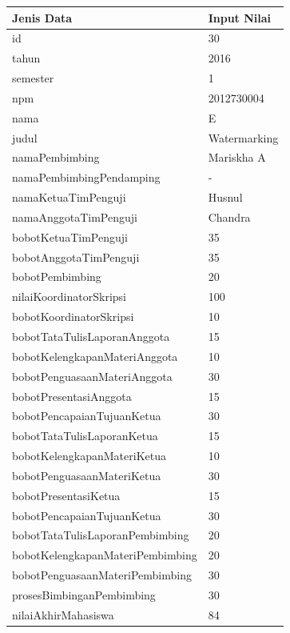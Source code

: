 	\begin{tabular}{| m{7cm} | m{5cm} |}
		\hline
		Jenis Data & Input Nilai\\
		\hline
		id & 30\\
		\hline
		tahun & 2016\\
		\hline
		semester & 1\\
		\hline
		npm & 2012730004\\
		\hline
		nama & E\\
		\hline
		judul & Watermarking\\
		\hline
		namaPembimbing & Mariskha A\\
		\hline
		namaPembimbingPendamping & -\\
		\hline
		namaKetuaTimPenguji & Husnul\\
		\hline
		namaAnggotaTimPenguji & Chandra\\
		\hline
		bobotKetuaTimPenguji & 35\\
		\hline
		bobotAnggotaTimPenguji & 35\\
		\hline
		bobotPembimbing & 20\\
		\hline
		nilaiKoordinatorSkripsi & 100\\
		\hline
		bobotKoordinatorSkripsi & 10\\
		\hline
		bobotTataTulisLaporanAnggota & 15\\
		\hline
		bobotKelengkapanMateriAnggota & 10\\
		\hline
		bobotPenguasaanMateriAnggota & 30\\
		\hline
		bobotPresentasiAnggota & 15\\
		\hline
		bobotPencapaianTujuanKetua & 30\\
		\hline
		bobotTataTulisLaporanKetua & 15\\
		\hline
		bobotKelengkapanMateriKetua & 10\\
		\hline
		bobotPenguasaanMateriKetua & 30\\
		\hline
		bobotPresentasiKetua & 15\\
		\hline
		bobotPencapaianTujuanKetua & 30\\
		\hline
		bobotTataTulisLaporanPembimbing & 20\\
		\hline
		bobotKelengkapanMateriPembimbing &20\\
		\hline
		bobotPenguasaanMateriPembimbing & 30\\
		\hline
		prosesBimbinganPembimbing & 30\\
		\hline
		nilaiAkhirMahasiswa & 84\\
		\hline
	\end{tabular}
	
